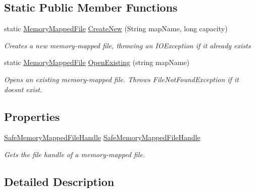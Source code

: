 \subsection*{Static Public Member Functions}
\begin{DoxyCompactItemize}
\item 
static \hyperlink{class_system_1_1_i_o_1_1_memory_mapped_files_1_1_memory_mapped_file}{Memory\+Mapped\+File} \hyperlink{class_system_1_1_i_o_1_1_memory_mapped_files_1_1_memory_mapped_file_a00c2f72365b2a60d4d5898afd02b2616}{Create\+New} (String map\+Name, long capacity)
\begin{DoxyCompactList}\small\item\em Creates a new memory-\/mapped file, throwing an I\+O\+Exception if it already exists \end{DoxyCompactList}\item 
static \hyperlink{class_system_1_1_i_o_1_1_memory_mapped_files_1_1_memory_mapped_file}{Memory\+Mapped\+File} \hyperlink{class_system_1_1_i_o_1_1_memory_mapped_files_1_1_memory_mapped_file_a43d06be520217c9df988d5bc0b84caa2}{Open\+Existing} (string map\+Name)
\begin{DoxyCompactList}\small\item\em Opens an existing memory-\/mapped file. Throws File\+Not\+Found\+Exception if it doesn\textquotesingle{}t exist. \end{DoxyCompactList}\end{DoxyCompactItemize}
\subsection*{Properties}
\begin{DoxyCompactItemize}
\item 
\hyperlink{class_microsoft_1_1_win32_1_1_safe_handles_1_1_safe_memory_mapped_file_handle}{Safe\+Memory\+Mapped\+File\+Handle} \hyperlink{class_system_1_1_i_o_1_1_memory_mapped_files_1_1_memory_mapped_file_a93692bb2875e67f3e62fcc43a1eb1602}{Safe\+Memory\+Mapped\+File\+Handle}
\begin{DoxyCompactList}\small\item\em Gets the file handle of a memory-\/mapped file. \end{DoxyCompactList}\end{DoxyCompactItemize}


\subsection{Detailed Description}


